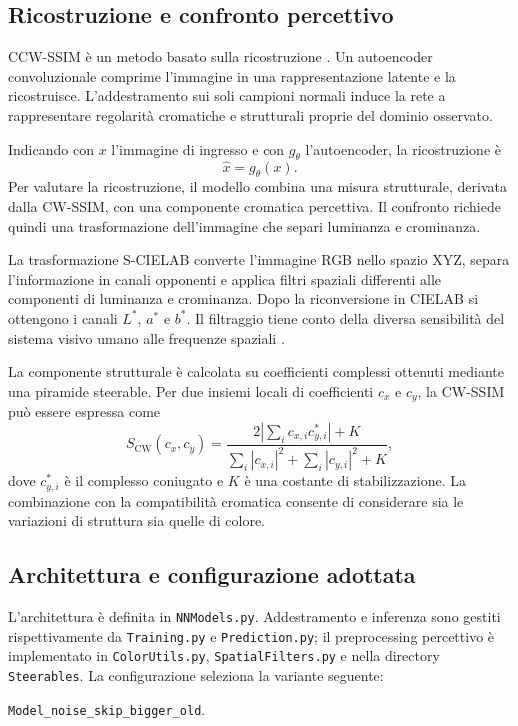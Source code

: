 \subsection{Ricostruzione e confronto percettivo}

CCW-SSIM è un metodo basato sulla ricostruzione \cite{Berasi_2023}. Un autoencoder convoluzionale comprime l'immagine in una rappresentazione latente e la ricostruisce. L'addestramento sui soli campioni normali induce la rete a rappresentare regolarità cromatiche e strutturali proprie del dominio osservato.

Indicando con $x$ l'immagine di ingresso e con $g_{\theta}$ l'autoencoder, la ricostruzione è
\begin{equation}
    \widehat{x} = g_{\theta}(x).
\end{equation}
Per valutare la ricostruzione, il modello combina una misura strutturale, derivata dalla CW-SSIM, con una componente cromatica percettiva. Il confronto richiede quindi una trasformazione dell’immagine che separi luminanza e crominanza.

La trasformazione S-CIELAB converte l'immagine RGB nello spazio XYZ, separa l'informazione in canali opponenti e applica filtri spaziali differenti alle componenti di luminanza e crominanza. Dopo la riconversione in CIELAB si ottengono i canali $L^*$, $a^*$ e $b^*$. Il filtraggio tiene conto della diversa sensibilità del sistema visivo umano alle frequenze spaziali \cite{Berasi_2023}.

La componente strutturale è calcolata su coefficienti complessi ottenuti mediante una piramide steerable. Per due insiemi locali di coefficienti $c_x$ e $c_y$, la CW-SSIM può essere espressa come
\begin{equation}
    S_{\mathrm{CW}}(c_x,c_y) =
    \frac{2\left|\sum_i c_{x,i}c_{y,i}^{*}\right|+K}
    {\sum_i |c_{x,i}|^2+\sum_i |c_{y,i}|^2+K},
    \label{eq:cap3-cwssim}
\end{equation}
dove $c_{y,i}^{*}$ è il complesso coniugato e $K$ è una costante di stabilizzazione. La combinazione con la compatibilità cromatica consente di considerare sia le variazioni di struttura sia quelle di colore.

\subsection{Architettura e configurazione adottata}

L'architettura è definita in \texttt{NNModels.py}. Addestramento e inferenza sono gestiti rispettivamente da \texttt{Training.py} e \texttt{Prediction.py}; il preprocessing percettivo è implementato in \texttt{ColorUtils.py}, \texttt{SpatialFilters.py} e nella directory \texttt{Steerables}. La configurazione seleziona la variante seguente:
\begin{center}
    \texttt{Model\_noise\_skip\_bigger\_old}.
\end{center}

